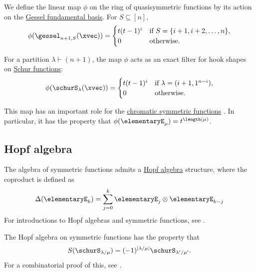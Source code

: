 \begin{definition}\label{def:hookFilter}
We define the linear map $\phi$ on the ring of quasisymmetric functions
by its action on the \hyperref[gesselDefinitionSubsets]{Gessel fundamental basis}.
For $S \subseteq [n]$,
\[
\phi(\gessel_{n+1,S}(\xvec)) =
\begin{cases}
t(t-1)^i & \text{if } S = \{i+1, i+2, \dotsc, n\}, \\
0 & \text{otherwise.}
\end{cases}
\]
\end{definition}

\begin{proposition}
For a partition $\lambda \vdash (n+1)$, the map $\phi$ acts as an exact filter
for hook shapes on \hyperref[schurS]{Schur functions}:
\[
\phi(\schurS_\lambda(\xvec)) =
\begin{cases}
t(t-1)^i & \text{if } \lambda = (i+1, 1^{n-i}), \\
0 & \text{otherwise.}
\end{cases}
\]
\end{proposition}

This map has an important role for the
\hyperref[chromaticQuasisymmetric]{chromatic symmetric functions}
\cite{Stanley1995}.
In particular, it has the property that
$\phi(\elementaryE_\mu) = t^{\length(\mu)}$.


\subsection[hopfAlgebraSymmetricFunctions]{Hopf algebra}

The algebra of symmetric functions admits a \hyperref[hopfAlgebra]{Hopf algebra}
structure,
where the coproduct is defined as
\[
\Delta( \elementaryE_k ) = \sum_{j=0}^k \elementaryE_j \otimes \elementaryE_{k-j}
\]
For introductions to Hopf algebras and symmetric functions, see
\cite{Cheng2014HopfSymmetricFunctions,GrinbergReiner2014Hopf}.


The Hopf algebra \label{symmetricFunctionAntipode} on symmetric functions
has the property that
\[
S( \schurS_{\lambda/\mu} ) = (-1)^{|\lambda/\mu|} \schurS_{\lambda'/\mu'}.
\]
For a combinatorial proof of this, see \cite{ChoHwangLee2026x}.
